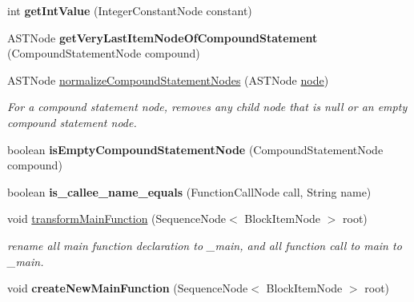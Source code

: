 \begin{DoxyCompactItemize}
\item 
\hypertarget{classedu_1_1udel_1_1cis_1_1vsl_1_1civl_1_1transform_1_1common_1_1BaseWorker_a3cd0538d54e1bedeaf6de0d774664f68}{}int {\bfseries get\+Int\+Value} (Integer\+Constant\+Node constant)\label{classedu_1_1udel_1_1cis_1_1vsl_1_1civl_1_1transform_1_1common_1_1BaseWorker_a3cd0538d54e1bedeaf6de0d774664f68}

\item 
\hypertarget{classedu_1_1udel_1_1cis_1_1vsl_1_1civl_1_1transform_1_1common_1_1BaseWorker_a23746937eb3705c8db8568fe1d944d1a}{}A\+S\+T\+Node {\bfseries get\+Very\+Last\+Item\+Node\+Of\+Compound\+Statement} (Compound\+Statement\+Node compound)\label{classedu_1_1udel_1_1cis_1_1vsl_1_1civl_1_1transform_1_1common_1_1BaseWorker_a23746937eb3705c8db8568fe1d944d1a}

\item 
A\+S\+T\+Node \hyperlink{classedu_1_1udel_1_1cis_1_1vsl_1_1civl_1_1transform_1_1common_1_1BaseWorker_a7451a0988a98376650c88976d488762a}{normalize\+Compound\+Statement\+Nodes} (A\+S\+T\+Node \hyperlink{structnode}{node})
\begin{DoxyCompactList}\small\item\em For a compound statement node, removes any child node that is null or an empty compound statement node. \end{DoxyCompactList}\item 
\hypertarget{classedu_1_1udel_1_1cis_1_1vsl_1_1civl_1_1transform_1_1common_1_1BaseWorker_a96246816abc8b40137039611d73cc08b}{}boolean {\bfseries is\+Empty\+Compound\+Statement\+Node} (Compound\+Statement\+Node compound)\label{classedu_1_1udel_1_1cis_1_1vsl_1_1civl_1_1transform_1_1common_1_1BaseWorker_a96246816abc8b40137039611d73cc08b}

\item 
\hypertarget{classedu_1_1udel_1_1cis_1_1vsl_1_1civl_1_1transform_1_1common_1_1BaseWorker_a6114d8bd372191360f990dc08ff30283}{}boolean {\bfseries is\+\_\+callee\+\_\+name\+\_\+equals} (Function\+Call\+Node call, String name)\label{classedu_1_1udel_1_1cis_1_1vsl_1_1civl_1_1transform_1_1common_1_1BaseWorker_a6114d8bd372191360f990dc08ff30283}

\item 
void \hyperlink{classedu_1_1udel_1_1cis_1_1vsl_1_1civl_1_1transform_1_1common_1_1BaseWorker_a1b423136b60c021853437a567eb3f4a9}{transform\+Main\+Function} (Sequence\+Node$<$ Block\+Item\+Node $>$ root)
\begin{DoxyCompactList}\small\item\em rename all main function declaration to \+\_\+main, and all function call to main to \+\_\+main. \end{DoxyCompactList}\item 
\hypertarget{classedu_1_1udel_1_1cis_1_1vsl_1_1civl_1_1transform_1_1common_1_1BaseWorker_a75f1bad128c8f9cefe0c4d1147dc5a42}{}void {\bfseries create\+New\+Main\+Function} (Sequence\+Node$<$ Block\+Item\+Node $>$ root)\label{classedu_1_1udel_1_1cis_1_1vsl_1_1civl_1_1transform_1_1common_1_1BaseWorker_a75f1bad128c8f9cefe0c4d1147dc5a42}


\end{DoxyCompactItemize}
